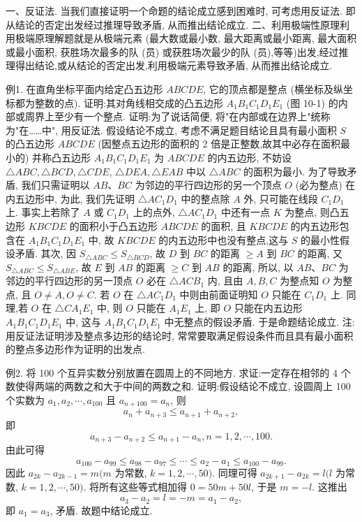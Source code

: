 
一、反证法.
当我们直接证明一个命题的结论成立感到困难时, 可考虑用反证法.
即从结论的否定出发经过推理导致矛盾, 从而推出结论成立.
二、利用极端性原理利用极端原理解题就是从极端元素 (最大数或最小数, 最大距离或最小距离, 最大面积或最小面积, 获胜场次最多的队 (员) 或获胜场次最少的队 (员),等等)出发,经过推理得出结论,或从结论的否定出发,利用极端元素导致矛盾, 从而推出结论成立.



例1. 在直角坐标平面内给定凸五边形 $A B C D E$, 它的顶点都是整点 (横坐标及纵坐标都为整数的点). 证明:其对角线相交成的凸五边形 $A_1 B_1 C_1 D_1 E_1$ (图 10-1) 的内部或周界上至少有一个整点.
证明:为了说话简便, 将"在内部或在边界上"统称为"在……中", 用反证法.
假设结论不成立, 考虑不满足题目结论且具有最小面积 $S$ 的凸五边形 $A B C D E$
(因整点五边形的面积的 2 倍是正整数,故其中必存在面积最小的) 并称凸五边形 $A_1 B_1 C_1 D_1 E_1$ 为 $A B C D E$ 的内五边形, 不妨设 $\triangle A B C, \triangle B C D, \triangle C D E$, $\triangle D E A, \triangle E A B$ 中以 $\triangle A B C$ 的面积为最小.
为了导致矛盾, 我们只需证明以 $A B 、 B C$ 为邻边的平行四边形的另一个顶点 $O$ (必为整点) 在内五边形中, 为此, 我们先证明 $\triangle A C_1 D_1$ 中的整点除 $A$ 外, 只可能在线段 $C_1 D_1$ 上.
事实上若除了 $A$ 或 $C_1 D_1$ 上的点外, $\triangle A C_1 D_1$ 中还有一点 $K$ 为整点, 则凸五边形 $K B C D E$ 的面积小于凸五边形 $A B C D E$ 的面积, 且 $K B C D E$ 的内五边形包含在 $A_1 B_1 C_1 D_1 E_1$ 中, 故 $K B C D E$ 的内五边形中也没有整点,这与 $S$ 的最小性假设矛盾.
其次, 因 $S_{\triangle A B C} \leqslant S_{\triangle B C D}$, 故 $D$ 到 $B C$ 的距离 $\geqslant A$ 到 $B C$ 的距离, 又 $S_{\triangle A B C} \leqslant S_{\triangle A B E}$, 故 $E$ 到 $A B$ 的距离 $\geqslant C$ 到 $A B$ 的距离, 所以, 以 $A B 、 B C$ 为邻边的平行四边形的另一顶点 $O$ 必在 $\triangle A C B_1$ 内, 且由 $A, B, C$ 为整点知 $O$ 为整点, 且 $O \neq A, O \neq C$. 
若 $O$ 在 $\triangle A C_1 D_1$ 中则由前面证明知 $O$ 只能在 $C_1 D_1$ 上.
同理,若 $O$ 在 $\triangle C A_1 E_1$ 中, 则 $O$ 只能在 $A_1 E_1$ 上, 即 $O$ 只能在内五边形
$A_1 B_1 C_1 D_1 E_1$ 中, 这与 $A_1 B_1 C_1 D_1 E_1$ 中无整点的假设矛盾.
于是命题结论成立.
注:用反证法证明涉及整点多边形的结论时, 常常要取满足假设条件而且具有最小面积的整点多边形作为证明的出发点.



例2. 将 100 个互异实数分别放置在圆周上的不同地方.
求证:一定存在相邻的 4 个数使得两端的两数之和大于中间的两数之和.
证明:假设结论不成立, 设圆周上 100 个实数为 $a_1, a_2, \cdots, a_{100}$ 且 $a_{n+100}=a_n$, 则
$$
a_n+a_{n+3} \leqslant a_{n+1}+a_{n+2},
$$
即
$$
a_{n+3}-a_{n+2} \leqslant a_{n+1}-a_n, n=1,2, \cdots, 100 .
$$
由此可得
$$
a_{100}-a_{99} \leqslant a_{98}-a_{97} \leqslant \cdots \leqslant a_2-a_1 \leqslant a_{100}-a_{99} .
$$
因此 $a_{2 k}-a_{2 k-1}=m(m$ 为常数, $k=1,2, \cdots, 50)$. 同理可得 $a_{2 k+1}-a_{2 k}=l(l$ 为常数, $k=1,2, \cdots, 50)$. 将所有这些等式相加得 $0=50 m+50 l$, 于是 $m= -l$. 这推出
$$
a_3-a_2=l=-m=a_1-a_2,
$$
即 $a_1=a_3$, 矛盾.
故题中结论成立.



